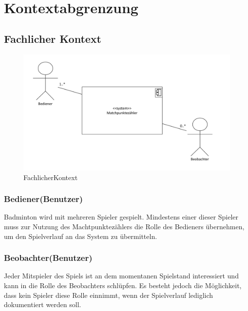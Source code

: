 \chapter{Kontextabgrenzung}

\section{Fachlicher Kontext}
\begin{figure}[H]
\begin{center}
\includegraphics[scale=0.5]{Grafiken/FachlicherKontext.pdf}
\caption{FachlicherKontext}
\end{center}
\end{figure}

\subsection*{Bediener(Benutzer)}
Badminton wird mit mehreren Spieler gespielt. Mindestens einer dieser Spieler muss zur Nutzung des Machtpunktezählers die Rolle des Bedieners übernehmen, um den Spielverlauf an das System zu übermitteln.
\subsection*{Beobachter(Benutzer)}
Jeder Mitspieler des Spiels ist an dem momentanen Spielstand interessiert und kann in die Rolle des Beobachters schlüpfen. Es besteht jedoch  die Möglichkeit, dass kein Spieler diese Rolle einnimmt, wenn der Spielverlauf lediglich dokumentiert werden soll.

